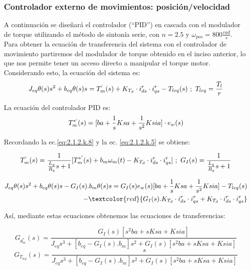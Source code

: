 \documentclass[10pt]{article}
\begin{document}
\subsubsection{Controlador externo de movimientos: posición/velocidad }
A continuación se diseñará el controlador (``PID'') en cascada con el modulador de torque utilizando el método de sintonía serie, con $n=2.5$ y $\omega_{pos}=800\frac{rad}{s}$.
Para obtener la ecuación de transferencia del sistema con el controlador de movimiento partiremos del modulador de torque obtenido en el inciso anterior, lo que nos permite tener un acceso directo a manipular el torque motor.
Considerando esto, la ecuación del sistema es:
		\begin{equation}
	J_{eq}\theta(s)s^{2}+b_{eq}\theta(s)s=T^{`}_{m}(s)+K_{T_{d}}\cdot i^{r}_{ds}\cdot i^{r}_{qs}-T_{leq}(s) \ ; \ T_{leq}= \frac{T_{l}}{r}
	\label{eq:2.1.2.q.1}
	\end{equation}
	
La ecuación del controlador PID es:
		\begin{equation}
	T^{*`}_{m}(s)=[ba+\frac{1}{s}Ksa + \frac{1}{s^{2}}Ksia]\cdot e_{w}(s)
	\label{eq:2.1.2.q.2}
	\end{equation}
	
Recordando la ec.\ref{eq:2.1.2.k.8} y la ec. \ref{eq:2.1.2.k.5} se obtiene:

	\begin{eqnarray}
	T^{`}_{m}(s)=\frac{1}{\frac{L_{q}}{R_{q}}s+1}[T^{*'}_{m}(s)+b_{m}\omega_{m}(t)-K_{T_{d}}\cdot i^{r}_{ds}\cdot i^{r}_{qs}] \ ; \ G_{I}(s)=\frac{1}{\frac{L_{q}}{R_{q}}s+1}
	\label{eq:2.1.2.q.4}
	\end{eqnarray}

	\begin{eqnarray}
	J_{eq}\theta(s)s^{2}+b_{eq}\theta(s)s-G_{I}(s).b_{m}\theta(s)s=G_{I}(s)e_{w}(s)[ba+\frac{1}{s}Ksa + \frac{1}{s^{2}}Ksia]-T_{leq}(s) \nonumber \\
	-\textcolor{red}{G_{I}(s).K_{T_{d}}\cdot i^{r}_{ds}\cdot i^{r}_{qs} + K_{T_{d}}\cdot i^{r}_{ds}\cdot i^{r}_{qs}}
	\label{eq:2.1.2.q.5}
	\end{eqnarray}
	
Así, mediante estas ecuaciones obtenemos las ecuaciones de transferencias:
 
	\begin{equation}
	G_{\theta^{*}_{m}}(s)=\frac{G_{I}(s)[s^{2}ba+sKsa+Ksia]}{J_{eq}s^{3}+[b_{eq}-G_{I}(s).b_{m}]s^{2}+G_{I}(s)[s^{2}ba+sKsa+Ksia]}
	\label{eq:2.1.2.q.6}
	\end{equation}
 	\begin{equation}
	G_{T_{leq}}(s)=\frac{s}{J_{eq}s^{3}+[b_{eq}-G_{I}(s).b_{m}]s^{2}+G_{I}(s)[s^{2}ba+sKsa+Ksia]}
	\label{eq:2.1.2.q.6}
	\end{equation}
	
\end{document}
